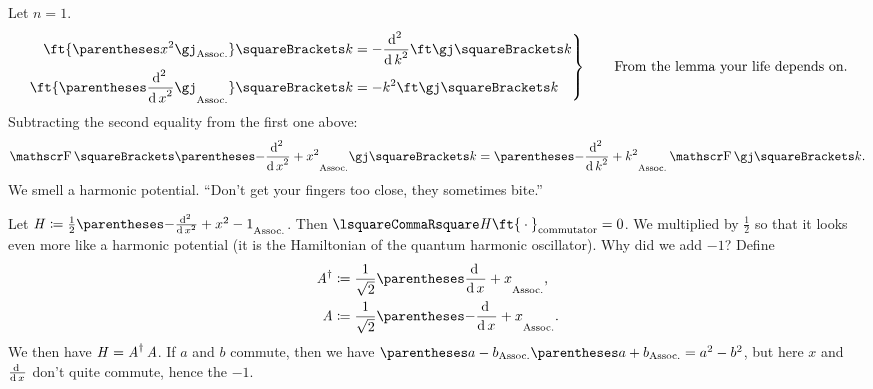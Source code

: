 \documentclass[10pt, a4paper, twoside]{lecturenotes}
\newcommand{\opAdag}{\adj{\opA}}
\begin{document}
\begin{lecture}[date=2013-03-07]
  Let $n=1$.
  \begin{equation*}
    \left.
    \begin{aligned}
      \ft{\pa{x^2\gj}}\of k &= -\derivop[2]{k}\ft\gj\of k \\
      \ft{\pa{\derivop[2]{x}\gj}}\of k &= -k^2 \ft\gj\of k
    \end{aligned}
    \right\rbrace \qquad \text{From the lemma your life depends on.}
  \end{equation*}
  Subtracting the second equality from the first one above:
  \begin{equation*}
    \FT\of{\pa{-\derivop[2]{x}+x^2}\gj}\of k = \pa{-\derivop[2]{k}+k^2}\FT\gj\of k\text{.}
  \end{equation*}
  We smell a harmonic potential. ``Don't get your fingers too close, they sometimes bite.''
  
  Let $\opH \DefineAs \frac{1}{2}\pa{-\derivop[2]{x}+x^2-1}$. Then $\commutator \opH {\ft{\placeholder}}=0$. We multiplied by $\frac{1}{2}$ so that it looks even more like a harmonic potential (it is the Hamiltonian of the quantum harmonic oscillator). Why did we add $-1$? Define
  \begin{align*}
    \opAdag &\DefineAs \frac{1}{\sqrt 2}\pa{\derivop{x} + x}\text{,}\\
    \opA &\DefineAs \frac{1}{\sqrt 2}\pa{-\derivop{x} + x}\text{.}
  \end{align*}
  We then have $\opH = \opAdag\opA$. If $a$ and $b$ commute, then we have $\pa{a-b}\pa{a+b}  = a^2-b^2$, but here $x$ and $\frac{\operatorname{d}^{} {}}{{\operatorname{d} {x}}^{}}$ don't quite commute, hence the $-1$.
\end{lecture}
\end{document}
